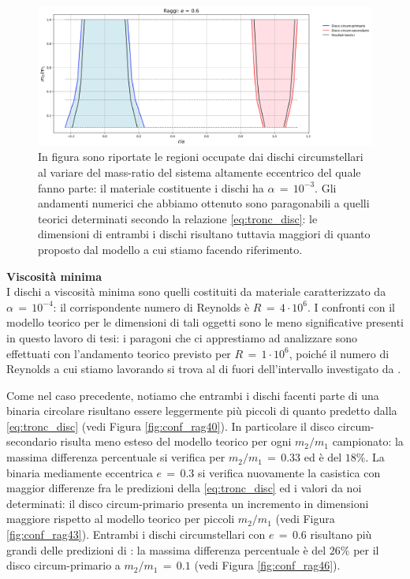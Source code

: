 \begin{figure}[H]
  \centering
  \includegraphics[width=\textwidth]{Immagini/Confronto/conrag_A3_e6.png}
  \caption{In figura sono riportate le regioni occupate dai dischi circumstellari al variare del mass-ratio del sistema altamente eccentrico del quale fanno parte: il materiale costituente i dischi ha $\alpha\,=\,10^{-3}$. Gli andamenti numerici che abbiamo ottenuto sono paragonabili a quelli teorici determinati secondo la relazione \eqref{eq:tronc_disc}: le dimensioni di entrambi i dischi risultano tuttavia maggiori di quanto proposto dal modello a cui stiamo facendo riferimento. }
  \label{fig:conf_rag36}
\end{figure}

\textbf{Viscosità minima}\\

I dischi a viscosità minima sono quelli costituiti da materiale caratterizzato da $\alpha\,=\,10^{-4}$: il corrispondente numero di Reynolds è $R\,=\,4 \cdot 10^{6}$. 
I confronti con il modello teorico per le dimensioni di tali oggetti sono le meno significative presenti in questo lavoro di tesi: i paragoni che ci apprestiamo ad analizzare sono effettuati con l'andamento teorico previsto per $R\,=\,1 \cdot 10^{6}$, poiché il numero di Reynolds a cui stiamo lavorando si trova al di fuori dell'intervallo investigato da \textcite{ManaraTronc2019}.

Come nel caso precedente, notiamo che entrambi i dischi facenti parte di una binaria circolare risultano essere leggermente più piccoli di quanto predetto dalla \eqref{eq:tronc_disc} (vedi Figura \ref{fig:conf_rag40}). In particolare il disco circum-secondario risulta meno esteso del modello teorico per ogni $m_2/m_1$ campionato: la massima differenza percentuale si verifica per $m_2/m_1\,=\,0.33$ ed è del $18\%$.
La binaria mediamente eccentrica $e\,=\,0.3$ si verifica nuovamente la casistica con maggior differenze fra le predizioni della \eqref{eq:tronc_disc} ed i valori da noi determinati: il disco circum-primario presenta un incremento in dimensioni maggiore rispetto al modello teorico per piccoli $m_2/m_1$ (vedi Figura \ref{fig:conf_rag43}).
Entrambi i dischi circumstellari con $e\,=\,0.6$ risultano più grandi delle predizioni di \textcite{ManaraTronc2019}: la massima differenza percentuale è del $26\%$ per il disco circum-primario a $m_2/m_1\,=\,0.1$ (vedi Figura \ref{fig:conf_rag46}). 

